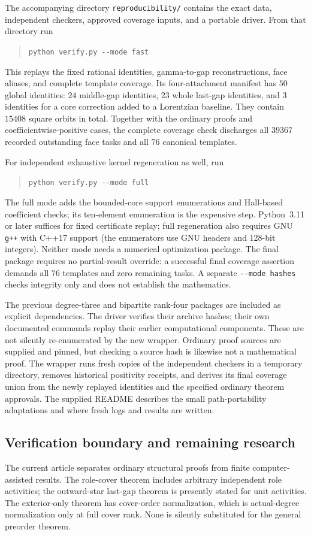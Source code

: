 \documentclass[11pt]{article}
\numberwithin{equation}{section}
\theoremstyle{definition}\newtheorem{definition}[theorem]{Definition}\newtheorem{remark}[theorem]{Remark}
\begin{document}
The accompanying directory \texttt{reproducibility/} contains the exact data, independent checkers, approved coverage inputs, and a portable driver. From that directory run
\begin{quote}
\verb|python verify.py --mode fast|
\end{quote}
This replays the fixed rational identities, gamma-to-gap reconstructions, face aliases, and complete template coverage. Its four-attachment manifest has $50$ global identities: $24$ middle-gap identities, $23$ whole last-gap identities, and $3$ identities for a core correction added to a Lorentzian baseline. They contain $15408$ square orbits in total. Together with the ordinary proofs and coefficientwise-positive cases, the complete coverage check discharges all $39367$ recorded outstanding face tasks and all $76$ canonical templates.

For independent exhaustive kernel regeneration as well, run
\begin{quote}
\verb|python verify.py --mode full|
\end{quote}
The full mode adds the bounded-core support enumerations and Hall-based coefficient checks; its ten-element enumeration is the expensive step. Python~3.11 or later suffices for fixed certificate replay; full regeneration also requires GNU \texttt{g++} with C++17 support (the enumerators use GNU headers and 128-bit integers). Neither mode needs a numerical optimization package. The final package requires no partial-result override: a successful final coverage assertion demands all $76$ templates and zero remaining tasks. A separate \verb|--mode hashes| checks integrity only and does not establish the mathematics.

The previous degree-three and bipartite rank-four packages are included as explicit dependencies. The driver verifies their archive hashes; their own documented commands replay their earlier computational components. These are not silently re-enumerated by the new wrapper. Ordinary proof sources are supplied and pinned, but checking a source hash is likewise not a mathematical proof. The wrapper runs fresh copies of the independent checkers in a temporary directory, removes historical positivity receipts, and derives its final coverage union from the newly replayed identities and the specified ordinary theorem approvals. The supplied README describes the small path-portability adaptations and where fresh logs and results are written.

\subsection{Verification boundary and remaining research}
The current article separates ordinary structural proofs from finite computer-assisted results. The role-cover theorem includes arbitrary independent role activities; the outward-star last-gap theorem is presently stated for unit activities. The exterior-only theorem has cover-order normalization, which is actual-degree normalization only at full cover rank. None is silently substituted for the general preorder theorem.
\end{document}
